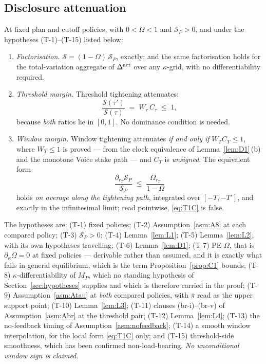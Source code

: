 \subsection{Disclosure attenuation}
\label{sec:attenuation}

\begin{theorem}
\label{thm:T1}
At fixed plan and cutoff policies, with $0 < \Omega < 1$ and $\mathcal S_P > 0$, and under the
hypotheses (T-1)--(T-15) listed below:
\begin{enumerate}[label=(\Alph*),leftmargin=2.4em,itemsep=3pt]
\item \emph{Factorisation.} $\mathcal S = (1-\Omega)\,\mathcal S_P$, exactly; and the same
  factorisation holds for the total-variation aggregate of $\Delta^{\mathrm{act}}$ over any $\kappa$-grid, with no
  differentiability required.
\item \emph{Threshold margin.} Threshold tightening attenuates:
  \begin{equation}
  \label{eq:T1B}
  \frac{\mathcal S(\tau')}{\mathcal S(\tau)} \;=\; W_\tau\,C_\tau \;\le\; 1,
  \end{equation}
  because \emph{both} ratios lie in $[0,1]$. No dominance condition is needed.
\item \emph{Window margin.} Window tightening attenuates \emph{if and only if} $W_T C_T \le 1$, where
  $W_T \le 1$ is proved --- from the clock equivalence of Lemma~\ref{lem:D1}\,(b) and the monotone
  Voice stake path --- and $C_T$ is \emph{unsigned}. The equivalent form
  \begin{equation}
  \label{eq:T1C}
  \frac{\partial_{r_T}\mathcal S_P}{\mathcal S_P} \;\le\; \frac{\Omega_{r_T}}{1-\Omega}
  \end{equation}
  holds \emph{on average along the tightening path}, integrated over $[-T,-T']$, and exactly in the
  infinitesimal limit; read pointwise, \eqref{eq:T1C} is false.
\end{enumerate}
The hypotheses are: (T-1) fixed policies; (T-2) Assumption~\ref{asm:A8} at each compared policy;
(T-3) $\mathcal S_P > 0$; (T-4) Lemma~\ref{lem:L1}; (T-5) Lemma~\ref{lem:L2}, with its own
hypotheses travelling; (T-6) Lemma~\ref{lem:D1}; (T-7) PE-$\Omega$, that is
$\partial_\kappa\Omega = 0$ at fixed policies --- derivable rather than assumed, and it is exactly
what fails in general equilibrium, which is the term Proposition~\ref{prop:C1} bounds; (T-8)
$\kappa$-differentiability of $M_P$, which no standing hypothesis of Section~\ref{sec:hypotheses}
supplies and which is therefore carried in the proof; (T-9) Assumption~\ref{asm:Atau} at
\emph{both} compared policies, with $\bar\pi$ read as the upper support point; (T-10)
Lemma~\ref{lem:L3}; (T-11) clauses (br-i)--(br-v) of Assumption~\ref{asm:Abr} at the threshold pair;
(T-12) Lemma~\ref{lem:L4}; (T-13) the no-feedback timing of Assumption~\ref{asm:nofeedback}; (T-14) a
smooth window interpolation, for the local form \eqref{eq:T1C} only; and (T-15) threshold-side
smoothness, which has been confirmed non-load-bearing. \emph{No unconditional window sign is
claimed.}
\end{theorem}

